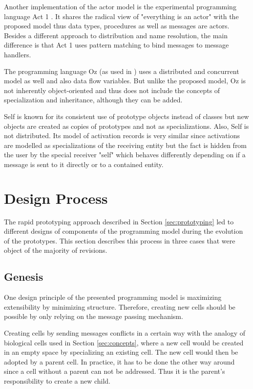 Another implementation of the actor model is the experimental programming language Act 1 \cite{Act1Parallelism}. It shares the radical view of "everything is an actor" with the proposed model thus data types, procedures as well as messages are actors. Besides a different approach to distribution and name resolution, the main difference is that Act 1 uses pattern matching to bind messages to message handlers.

The programming language Oz (as used in \cite{ConceptsOfProgramming}) uses a distributed and concurrent model as well and also data flow variables. But unlike the proposed model, Oz is not inherently object-oriented and thus does not include the concepts of specialization and inheritance, although they can be added.

Self \cite{Self} is known for its consistent use of prototype objects instead of classes but new objects are created as copies of prototypes and not as specializations. Also, Self is not distributed. Its model of activation records is very similar since activations are modelled as specializations of the receiving entity but the fact is hidden from the user by the special receiver "self" which behaves differently depending on if a message is sent to it directly or to a contained entity.


\section{Design Process}

The rapid prototyping approach described in Section \ref{sec:prototyping} led to different designs of components of the programming model during the evolution of the prototypes. This section describes this process in three cases that were object of the majority of revisions.

\subsection{Genesis}

One design principle of the presented programming model is maximizing extensibility by minimizing structure. Therefore, creating new cells should be possible by only relying on the message passing mechanism.

Creating cells by sending messages conflicts in a certain way with the analogy of biological cells used in Section \ref{sec:concepts}, where a new cell would be created in an empty space by specializing an existing cell. The new cell would then be adopted by a parent cell. In practice, it has to be done the other way around since a cell without a parent can not be addressed. Thus it is the parent's responsibility to create a new child.

